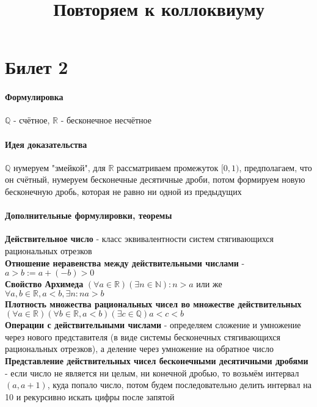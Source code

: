 \documentclass[a4paper,10pt]{article}
\title{Повторяем к коллоквиуму}
\date{}
\begin{document}
	\maketitle
	\tableofcontents
	\newpage
	\section{Билет 2}
	\begin{center} 
		\item \paragraph{Формулировка} 
	\end{center}
	$\mathbb{Q}$ - счётное, $\mathbb{R}$ - бесконечное несчётное \\
	\begin{center} 
		\item \paragraph{Идея доказательства} 
	\end{center}
	$\mathbb{Q}$ нумеруем "змейкой", для $\mathbb{R}$ рассматриваем промежуток $[0, 1)$, предполагаем, что он счётный, нумеруем бесконечные десятичные дроби, потом формируем новую бесконечную дробь, которая не равно ни одной из предыдущих
	\begin{center} 
		\item \paragraph{Дополнительные формулировки, теоремы} 
	\end{center}
	\textbf{Действительное число} - класс эквивалентности систем стягивающихся рациональных отрезков \\
	\textbf{Отношение неравенства между действительными числами} - $a>b := a + (-b) > 0$ \\
	\textbf{Свойство Архимеда} $(\forall a \in \mathbb{R}) (\exists n \in \mathbb{N}) \colon n > a$ или же $\forall a, b \in \mathbb{R}, a<b, \exists n \colon na>b$ \\
	\textbf{Плотность множества рациональных чисел во множестве действительных} $(\forall a \in \mathbb{R})(\forall b \in \mathbb{R}, a < b)(\exists c \in \mathbb{Q}) a < c < b$ \\
	\textbf{Операции с действительными числами} - определяем сложение и умножение через нового представителя (в виде системы бесконечных стягивающихся рациональных отрезков), а деление через умножение на обратное число \\
	\textbf{Представление действительных чисел бесконечными десятичными дробями} - если число не является ни целым, ни конечной дробью, то возьмём интервал $(a, a+1)$, куда попало число, потом будем последовательно делить интервал на 10 и рекурсивно искать цифры после запятой \\
\end{document}
